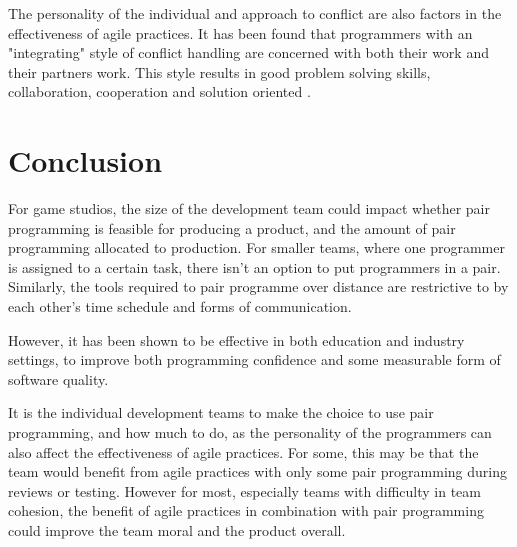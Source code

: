 \documentclass{scrartcl}
\begin{document}
The personality of the individual and approach to conflict are also factors in the effectiveness of agile practices. It has been found that programmers with an "integrating" style of conflict handling are concerned with both their work and their partners work. This style results in good problem solving skills, collaboration, cooperation and solution oriented \cite{Domino:2003}.

\section*{Conclusion}
For game studios, the size of the development team could impact whether pair programming is feasible for producing a product, and the amount of pair programming allocated to production. For smaller teams, where one programmer is assigned to a certain task, there isn't an option to put programmers in a pair. Similarly, the tools required to pair programme over distance are restrictive to by each other's time schedule and forms of communication.

However, it has been shown to be effective in both education and industry settings, to improve both programming confidence and some measurable form of software quality.

It is the individual development teams to make the choice to use pair programming, and how much to do, as the personality of the programmers can also affect the effectiveness of agile practices. For some, this may be that the team would benefit from agile practices with only some pair programming during reviews or testing. However for most, especially teams with difficulty in team cohesion, the benefit of agile practices in combination with pair programming could improve the team moral and the product overall.



\end{document}
